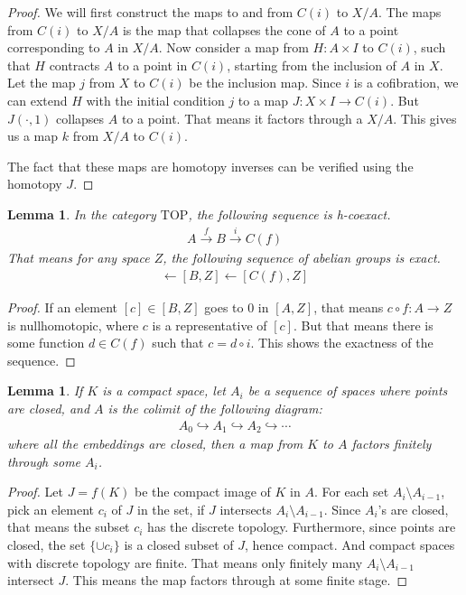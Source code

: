 \documentclass[12pt, notitlepage]{article}
\newtheorem{lem}[thm]{Lemma}
\theoremstyle{definition}
\newcommand{\cat}[1]{\mathrm{#1}}
\begin{document}
\begin{proof}
  We will first construct the maps to and from $C(i)$ to $X/A$. The maps from $C(i)$ to $X/A$ is the
  map that collapses the cone of $A$ to a point corresponding to $A$ in $X/A$. Now consider a map
  from $H: A \times I$ to $C(i)$, such that $H$ contracts $A$ to a point in $C(i)$, starting from
  the inclusion of $A$ in $X$. Let the map $j$ from $X$ to $C(i)$ be the inclusion map. Since $i$ is
  a cofibration, we can extend $H$ with the initial condition $j$ to a map $J: X \times I \to
  C(i)$. But $J(\cdot, 1)$ collapses $A$ to a point. That means it factors through a $X/A$. This
  gives us a map $k$ from $X/A$ to $C(i)$.

  The fact that these maps are homotopy inverses can be verified  using the homotopy $J$.
\end{proof}

\begin{lem}
  In the category $\cat{TOP}$, the following sequence is h-coexact.
  \begin{align*}
    A \xrightarrow{f} B \xrightarrow{i} C(f)
  \end{align*}
  That means for any space $Z$, the following sequence of abelian groups is exact.
  \begin{align*}
    [A, Z] \leftarrow [B,Z] \leftarrow [C(f), Z]
  \end{align*}
\end{lem}

\begin{proof}
  If an element $[c] \in [B,Z]$ goes to $0$ in $[A, Z]$, that means $c \circ f: A \to Z$ is
  nullhomotopic, where $c$ is a representative of $[c]$. But that means there is some function
  $d \in C(f)$ such that $c = d \circ i$. This shows the exactness of the sequence.
\end{proof}

\begin{lem}
  If $K$ is a compact space, let $A_i$ be a sequence of spaces where points are closed, and $A$ is
  the colimit of the following diagram:
  \begin{align*}
    A_0 \hookrightarrow A_1 \hookrightarrow A_2 \hookrightarrow \cdots
  \end{align*}
  where all the embeddings are closed, then a map from $K$ to $A$ factors finitely through some
  $A_i$.
\end{lem}

\begin{proof}
  Let $J = f(K)$ be the compact image of $K$ in $A$. For each set $A_i \setminus A_{i-1}$, pick an
  element $c_i$ of $J$ in the set, if $J$ intersects $A_i \setminus A_{i-1}$. Since $A_i$'s are
  closed, that means the subset $c_i$ has the discrete topology. Furthermore, since points are
  closed, the set $\{\cup c_i\}$ is a closed subset of $J$, hence compact. And compact spaces with
  discrete topology are finite. That means only finitely many $A_i \setminus A_{i-1}$ intersect $J$.
  This means the map factors through at some finite stage.
\end{proof}
\end{document}
